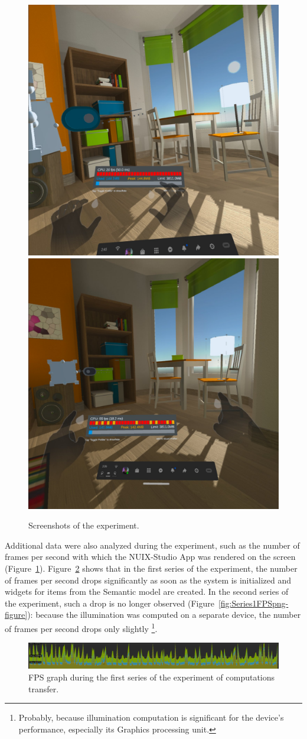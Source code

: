 \begin{figure}
  \centering
    {\includegraphics[width=0.45\linewidth]{figures/Series1FPSOculus.jpg}}
    {\includegraphics[width=0.45\linewidth]{figures/Series2FPSOculus.jpg}}
  \caption{Screenshots of the experiment.}
  \label{fig:exp-screenshot}
\end{figure}

Additional data were also analyzed during the experiment, such as the number of frames per second with which the NUIX-Studio App was rendered on the screen (Figure~\ref{fig:exp-screenshot}). Figure~\ref{fig:Series2FPSpng-figure} shows that in the first series of the experiment, the number of frames per second drops significantly as soon as the system is initialized and widgets for items from the Semantic model are created. In the second series of the experiment, such a drop is no longer observed (Figure~\ref{fig:Series1FPSpng-figure}): because the illumination was computed on a separate device, the number of frames per second drops only slightly \footnote{Probably, because illumination computation is significant for the device's performance, especially its Graphics processing unit.}.


\begin{figure}
  \centering
  \includegraphics[width = 0.9 \linewidth]{figures/Series2FPSpng.png}
  \caption{FPS graph during the first series of the experiment of computations transfer.}
  \label{fig:Series2FPSpng-figure}
\end{figure}

